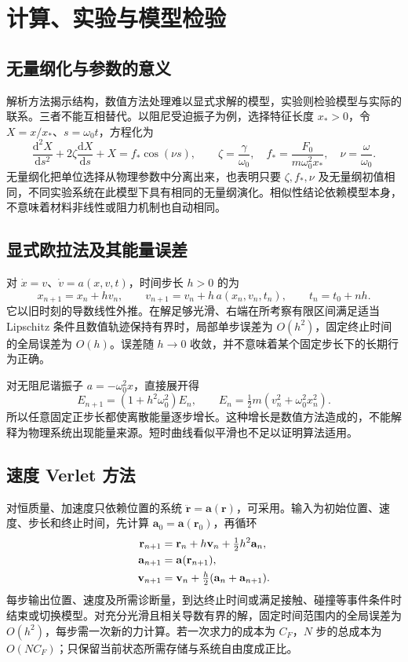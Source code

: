 \documentclass[UTF8,12pt,a4paper,fontset=fandol]{ctexbook}
\begin{document}
\chapter{计算、实验与模型检验}
\label{chap:mech-computation}

\section{无量纲化与参数的意义}
解析方法揭示结构，数值方法处理难以显式求解的模型，实验则检验模型与实际的联系。三者不能互相替代。以阻尼受迫振子为例，选择特征长度 $x_*>0$，令 $X=x/x_*$、$s=\omega_0t$，方程化为
\[
 \frac{\mathrm d^2X}{\mathrm ds^2}+2\zeta\frac{\mathrm dX}{\mathrm ds}+X=f_*\cos(\nu s),
 \qquad \zeta=\frac\gamma{\omega_0},\quad f_*=\frac{F_0}{m\omega_0^2x_*},\quad \nu=\frac\omega{\omega_0}.
\]
无量纲化把单位选择从物理参数中分离出来，也表明只要 $\zeta,f_*,\nu$ 及无量纲初值相同，不同实验系统在此模型下具有相同的无量纲演化。相似性结论依赖模型本身，不意味着材料非线性或阻力机制也自动相同。

\section{显式欧拉法及其能量误差}
对 $\dot x=v$、$\dot v=a(x,v,t)$，时间步长 $h>0$ 的为
\[
 x_{n+1}=x_n+hv_n,\qquad v_{n+1}=v_n+h\,a(x_n,v_n,t_n),\qquad t_n=t_0+nh.
\]
它以旧时刻的导数线性外推。在解足够光滑、右端在所考察有限区间满足适当 Lipschitz 条件且数值轨迹保持有界时，局部单步误差为 $O(h^2)$，固定终止时间的全局误差为 $O(h)$。误差随 $h\to0$ 收敛，并不意味着某个固定步长下的长期行为正确。

对无阻尼谐振子 $a=-\omega_0^2x$，直接展开得
\begin{equation}
 E_{n+1}=(1+h^2\omega_0^2)E_n,
 \qquad E_n=\tfrac12m(v_n^2+\omega_0^2x_n^2).
 \label{eq:mech-euler-energy}
\end{equation}
所以任意固定正步长都使离散能量逐步增长。这种增长是数值方法造成的，不能解释为物理系统出现能量来源。短时曲线看似平滑也不足以证明算法适用。

\section{速度 Verlet 方法}
对恒质量、加速度只依赖位置的系统 $\ddot{\mathbf r}=\mathbf a(\mathbf r)$，可采用。输入为初始位置、速度、步长和终止时间，先计算 $\mathbf a_0=\mathbf a(\mathbf r_0)$，再循环
\begin{align}
 \mathbf r_{n+1}&=\mathbf r_n+h\mathbf v_n+\tfrac12h^2\mathbf a_n,\notag\\
 \mathbf a_{n+1}&=\mathbf a(\mathbf r_{n+1}),\notag\\
 \mathbf v_{n+1}&=\mathbf v_n+\tfrac h2(\mathbf a_n+\mathbf a_{n+1}).
 \label{eq:mech-verlet}
\end{align}
每步输出位置、速度及所需诊断量，到达终止时间或满足接触、碰撞等事件条件时结束或切换模型。对充分光滑且相关导数有界的解，固定时间范围内的全局误差为 $O(h^2)$，每步需一次新的力计算。若一次求力的成本为 $C_F$，$N$ 步的总成本为 $O(NC_F)$；只保留当前状态所需存储与系统自由度成正比。
\end{document}
